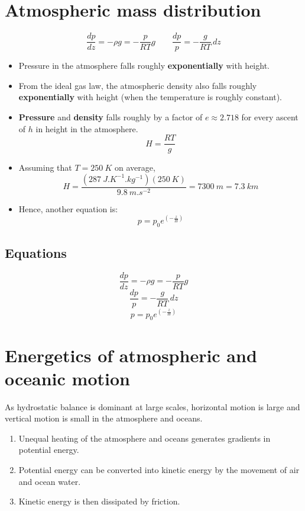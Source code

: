 \documentclass[11pt]{article}
\begin{document}
\section{Atmospheric mass distribution}
\label{sec:org4d0676f}
\[\frac{dp}{dz} = - \rho g = - \frac{p}{RT}g \qquad \frac{dp}{p} = - \frac{g}{RT} \, dz\]
\begin{itemize}
\item Pressure in the atmosphere falls roughly \textbf{exponentially} with height.
\item From the ideal gas law, the atmospheric density also falls roughly \textbf{exponentially} with height (when the temperature is roughly constant).
\item \textbf{Pressure} and \textbf{density} falls roughly by a factor of \(e \approx 2.718\) for every ascent of \(h\) in height in the atmosphere.
\[H = \frac{RT}{g}\]

\item Assuming that \(T = \qty{250}{K}\) on average,
\[H = \frac{\left(\qty{287}{J.K^{-1}.kg^{-1}} \right) \left(\qty{250}{K} \right)}{\qty{9.8}{m.s^{-2}}} = \qty{7300}{m} = \qty{7.3}{km}\]

\item Hence, another equation is:
\[p = p_0 e^{\left(-\frac{z}{H} \right)}\]
\end{itemize}

\subsection{Equations}
\label{sec:orgec61488}
\[\frac{dp}{dz} = - \rho g = - \frac{p}{RT}g\]
\[\frac{dp}{p} = - \frac{g}{RT} \, dz\]
\[p = p_0 e^{\left(-\frac{z}{H} \right)}\]


\section{Energetics of atmospheric and oceanic motion}
\label{sec:org390f830}
As hydrostatic balance is dominant at large scales, horizontal motion is large and vertical motion is small in the atmosphere and oceans.

\begin{enumerate}
\item Unequal heating of the atmosphere and oceans generates gradients in potential energy.
\item Potential energy can be converted into kinetic energy by the movement of air and ocean water.
\item Kinetic energy is then dissipated by friction.
\end{enumerate}
\end{document}
